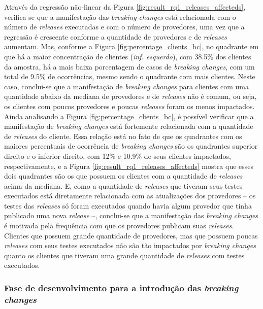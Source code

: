 Através da regressão não-linear da Figura \ref{fig:result_rq1_releases_affecteds}, verifica-se que a manifestação das \textit{breaking changes} está relacionada com o número de \textit{releases} executadas e com o número de provedores, uma vez que a regressão é crescente conforme a quantidade de provedores e de \textit{releases} aumentam. Mas, conforme a Figura \ref{fig:percentage_clients_bc}, no quadrante em que há a maior concentração de clientes (\textit{inf. esquerdo}), com 38.5\% dos clientes da amostra, há a mais baixa porcentagem de casos de \textit{breaking changes}, com um total de 9.5\% de ocorrências, mesmo sendo o quadrante com mais clientes. Neste caso, conclui-se que a manifestação de \textit{breaking changes} para clientes com uma quantidade abaixo da mediana de provedores e de \textit{releases} não é comum, ou seja, os clientes com poucos provedores e poucas \textit{releases} foram os menos impactados. Ainda analisando a Figura \ref{fig:percentage_clients_bc}, é possível verificar que a manifestação de \textit{breaking changes} está fortemente relacionada com a quantidade de \textit{releases} do cliente. Essa relação está no fato de que os quadrantes com os maiores percentuais de ocorrência de \textit{breaking changes} são os quadrantes superior direito e o inferior direito, com 12\% e 10.9\% de seus clientes impactados, respectivamente, e a Figura \ref{fig:result_rq1_releases_affecteds} mostra que esses dois quadrantes são os que possuem os clientes com a quantidade de \textit{releases} acima da mediana. E, como a quantidade de \textit{releases} que tiveram seus testes executados está diretamente relacionada com as atualizações dos provedores -- os testes das \textit{releases} só foram executados quando havia algum provedor que tinha publicado uma nova \textit{release} --, conclui-se que a manifestação das \textit{breaking changes} é motivada pela frequência com que os provedores publicam suas \textit{releases}. Clientes que possuem grande quantidade de provedores, mas que possuem poucas \textit{releases} com seus testes executados não são tão impactados por \textit{breaking changes} quanto os clientes que tiveram uma grande quantidade de \textit{releases} com testes executados.

\subsubsection{Fase de desenvolvimento para a introdução das \textit{breaking changes}}

